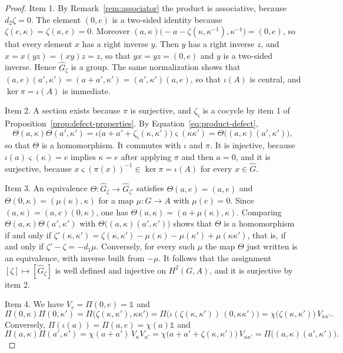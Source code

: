 \begin{proof}
	Item 1. By Remark~\ref{rem:associator} the product is associative, because $d_2\zeta=0$. The element $(0,e)$ is a two-sided identity because $\zeta(e,\kappa)=\zeta(\kappa,e)=0$. Moreover $(a,\kappa)\big(-a-\zeta(\kappa,\kappa^{-1}),\kappa^{-1}\big)=(0,e)$, so that every element $x$ has a right inverse $y$. Then $y$ has a right inverse $z$, and $x=x(yz)=(xy)z=z$, so that $yx=yz=(0,e)$ and $y$ is a two-sided inverse. Hence $\widehat{G}_\zeta$ is a group. The same normalization shows that $(a,e)(a',\kappa')=(a+a',\kappa')=(a',\kappa')(a,e)$, so that $\iota(A)$ is central, and $\ker\pi=\iota(A)$ is immediate.
	
	Item 2. A section exists because $\pi$ is surjective, and $\zeta_\varsigma$ is a cocycle by item 1 of Proposition~\ref{prop:defect-properties}. By Equation~\eqref{eq:product-defect},
	\begin{equation*}
		\Theta(a,\kappa)\Theta(a',\kappa')=\iota\big(a+a'+\zeta_\varsigma(\kappa,\kappa')\big)\varsigma(\kappa\kappa')=\Theta\big((a,\kappa)(a',\kappa')\big),
	\end{equation*}
	so that $\Theta$ is a homomorphism. It commutes with $\iota$ and $\pi$. It is injective, because $\iota(a)\varsigma(\kappa)=e$ implies $\kappa=e$ after applying $\pi$ and then $a=0$, and it is surjective, because $x\varsigma(\pi(x))^{-1}\in\ker\pi=\iota(A)$ for every $x\in\widehat{G}$.
	
	Item 3. An equivalence $\Theta:\widehat{G}_\zeta\to\widehat{G}_{\zeta'}$ satisfies $\Theta(a,e)=(a,e)$ and $\Theta(0,\kappa)=(\mu(\kappa),\kappa)$ for a map $\mu:G\to A$ with $\mu(e)=0$. Since $(a,\kappa)=(a,e)(0,\kappa)$, one has $\Theta(a,\kappa)=(a+\mu(\kappa),\kappa)$. Comparing $\Theta(a,\kappa)\Theta(a',\kappa')$ with $\Theta\big((a,\kappa)(a',\kappa')\big)$ shows that $\Theta$ is a homomorphism if and only if $\zeta'(\kappa,\kappa')=\zeta(\kappa,\kappa')-\mu(\kappa)-\mu(\kappa')+\mu(\kappa\kappa')$, that is, if and only if $\zeta'-\zeta=-d_1\mu$. Conversely, for every such $\mu$ the map $\Theta$ just written is an equivalence, with inverse built from $-\mu$. It follows that the assignment $[\zeta]\mapsto[\widehat{G}_\zeta]$ is well defined and injective on $H^2(G,A)$, and it is surjective by item 2.
	
	Item 4. We have $V_e=\Pi(0,e)=\mathbb{1}$ and
	\begin{equation*}
		\Pi(0,\kappa)\Pi(0,\kappa')=\Pi\big(\zeta(\kappa,\kappa'),\kappa\kappa'\big)=\Pi\big(\iota(\zeta(\kappa,\kappa'))\,(0,\kappa\kappa')\big)=\chi\big(\zeta(\kappa,\kappa')\big)\,V_{\kappa\kappa'}.
	\end{equation*}
	Conversely, $\Pi(\iota(a))=\Pi(a,e)=\chi(a)\mathbb{1}$ and
	\begin{equation*}
		\Pi(a,\kappa)\Pi(a',\kappa')=\chi(a+a')\,V_\kappa V_{\kappa'}=\chi\big(a+a'+\zeta(\kappa,\kappa')\big)\,V_{\kappa\kappa'}=\Pi\big((a,\kappa)(a',\kappa')\big).
	\end{equation*}
\end{proof}

